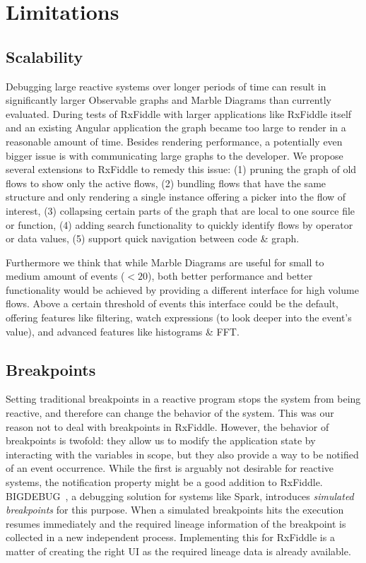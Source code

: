 \section{Limitations}
\subsection{Scalability}
Debugging large reactive systems over longer periods of time can result in significantly larger Observable graphs and Marble Diagrams than currently evaluated. During tests of RxFiddle with larger applications like RxFiddle itself and an existing Angular application the graph became too large to render in a reasonable amount of time. Besides rendering performance, a potentially even bigger issue is with communicating large graphs to the developer. We propose several extensions to RxFiddle to remedy this issue: (1) pruning the graph of old flows to show only the active flows, (2) bundling flows that have the same structure and only rendering a single instance offering a picker into the flow of interest, (3) collapsing certain parts of the graph that are local to one source file or function, (4) adding search functionality to quickly identify flows by operator or data values, (5) support quick navigation between code \& graph.

Furthermore we think that while Marble Diagrams are useful for small to medium amount of events ($< 20$), both better performance and better functionality would be achieved by providing a different interface for high volume flows. Above a certain threshold of events this interface could be the default, offering features like filtering, watch expressions (to look deeper into the event's value), and advanced features like histograms \& FFT.

\subsection{Breakpoints}
Setting traditional breakpoints in a reactive program stops the system from being reactive, and therefore can change the behavior of the system. This was our reason not to deal with breakpoints in RxFiddle. However, the behavior of breakpoints is twofold: they allow us to modify the application state by interacting with the variables in scope, but they also provide a way to be notified of an event occurrence. While the first is arguably not desirable for reactive systems, the notification property might be a good addition to RxFiddle. BIGDEBUG~\cite{Gulzar2016}, a debugging solution for systems like Spark, introduces \textit{simulated breakpoints} for this purpose. When a simulated breakpoints hits the execution resumes immediately and the required lineage information of the breakpoint is collected in a new independent process. Implementing this for RxFiddle is a matter of creating the right UI as the required lineage data is already available.
